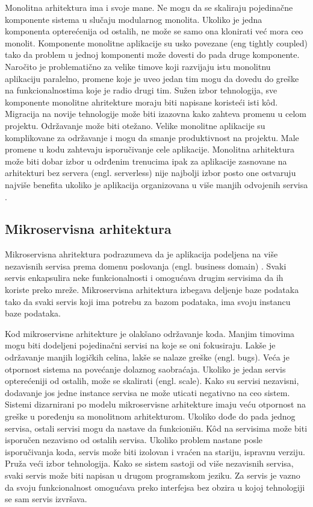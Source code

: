 \documentclass[12pt,oneside]{memoir}
\begin{document}
Monolitna arhitektura ima i svoje mane. Ne mogu da se skaliraju pojedinačne komponente sistema u slučaju modularnog monolita. Ukoliko je jedna komponenta opterećenija od ostalih, ne može se samo ona klonirati već mora ceo monolit. Komponente monolitne aplikacije su usko povezane (eng tightly coupled) tako da problem u jednoj komponenti može dovesti do pada druge komponente. Naročito je problematično za velike timove koji razvijaju istu monolitnu aplikaciju paralelno, promene koje je uveo jedan tim mogu da dovedu do greške na funkcionalnostima koje je radio drugi tim. Sužen izbor tehnologija, sve komponente monolitne ahritekture moraju biti napisane koristeći isti kôd. Migracija na novije tehnologije može biti izazovna kako zahteva promenu u celom projektu. Održavanje može biti otežano. Velike monolitne aplikacije su komplikovane za održavanje i mogu da smanje produktivnost na projektu. Male promene u kodu zahtevaju isporučivanje cele aplikacije. Monolitna arhitektura može biti dobar izbor u odrđenim trenucima ipak za aplikacije zasnovane na arhitekturi bez servera (engl. serverless) nije najbolji izbor posto one ostvaruju najviše benefita ukoliko je aplikacija organizovana u više manjih odvojenih servisa \cite{sa}.

\subsection{Mikroservisna arhitektura}
Mikroservisna ahritektura podrazumeva da je aplikacija podeljena na više nezavisnih servisa prema domenu poslovanja (engl. business domain) \cite{bm}. Svaki servis enkapsulira neke funkcionalnosti i omogućava drugim servisima da ih koriste preko mreže. Mikroservisna arhitektura izbegava deljenje baze podataka tako da svaki servis koji ima potrebu za bazom podataka, ima svoju instancu baze podataka. 

Kod mikroservisne arhitekture je olakšano održavanje koda. Manjim timovima mogu biti dodeljeni pojedinačni servisi na koje se oni fokusiraju. Lakše je održavanje manjih logičkih celina, lakše se nalaze greške (engl. bugs). Veća je otpornost sistema na povećanje dolaznog saobraćaja. Ukoliko je jedan servis opterećeniji od ostalih, može se skalirati (engl. scale). Kako su servisi nezavisni, dodavanje jos jedne instance servisa ne može uticati negativno na ceo sistem. Sistemi dizarnirani po modelu mikroservisne arhitekture imaju veću otpornost na greške u poređenju sa monolitnom arhitekturom. Ukoliko dođe do pada jednog servisa, ostali servisi mogu da nastave da funkcionišu. Kôd na servisima može biti isporučen nezavisno od ostalih servisa. Ukoliko problem nastane posle isporučivanja koda, servis može biti izolovan i vraćen na stariju, ispravnu verziju. Pruža veći izbor tehnologija. Kako se sistem sastoji od više nezavisnih servisa, svaki servis može biti napisan u drugom programskom jeziku. Za servis je vazno da svoju funkcionalnost omogućava preko interfejsa bez obzira u kojoj tehnologiji se sam servis izvršava.
\end{document}
